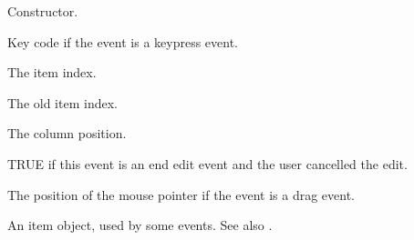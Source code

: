 Constructor.



Key code if the event is a keypress event.



The item index.



The old item index.



The column position.



TRUE if this event is an end edit event and the user cancelled the edit.



The position of the mouse pointer if the event is a drag event.



An item object, used by some events. See also .


